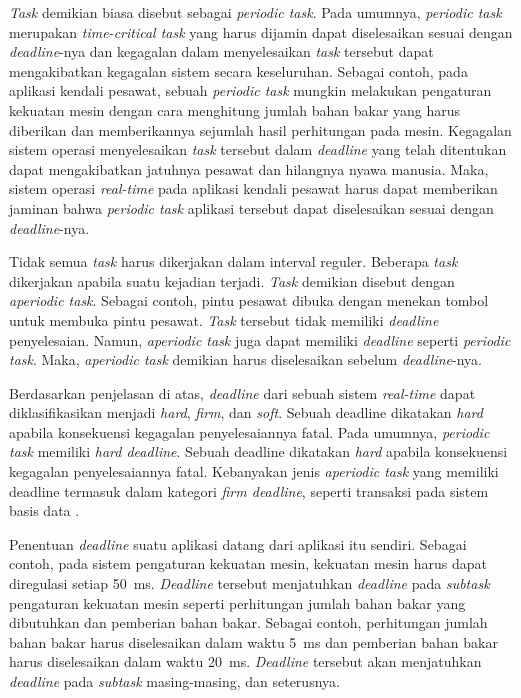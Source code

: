 \textit{Task} demikian biasa disebut sebagai \textit{periodic task}.
Pada umumnya, \textit{periodic task} merupakan \textit{time-critical task} yang harus dijamin dapat diselesaikan sesuai dengan \textit{deadline}-nya dan kegagalan dalam menyelesaikan \textit{task} tersebut dapat mengakibatkan kegagalan sistem secara keseluruhan.
Sebagai contoh, pada aplikasi kendali pesawat, sebuah \textit{periodic task} mungkin melakukan pengaturan kekuatan mesin dengan cara menghitung jumlah bahan bakar yang harus diberikan dan memberikannya sejumlah hasil perhitungan pada mesin.
Kegagalan sistem operasi menyelesaikan \textit{task} tersebut dalam \textit{deadline} yang telah ditentukan dapat mengakibatkan jatuhnya pesawat dan hilangnya nyawa manusia.
Maka, sistem operasi \textit{real-time} pada aplikasi kendali pesawat harus dapat memberikan jaminan bahwa \textit{periodic task} aplikasi tersebut dapat diselesaikan sesuai dengan \textit{deadline}-nya.

Tidak semua \textit{task} harus dikerjakan dalam interval reguler. Beberapa \textit{task} dikerjakan apabila suatu kejadian terjadi.
\textit{Task} demikian disebut dengan \textit{aperiodic task}.
Sebagai contoh, pintu pesawat dibuka dengan menekan tombol untuk membuka pintu pesawat.
\textit{Task} tersebut tidak memiliki \textit{deadline} penyelesaian.
Namun, \textit{aperiodic task} juga dapat memiliki \textit{deadline} seperti \textit{periodic task}.
Maka, \textit{aperiodic task} demikian harus diselesaikan sebelum \textit{deadline}-nya.

Berdasarkan penjelasan di atas, \textit{deadline} dari sebuah sistem \textit{real-time} dapat diklasifikasikan menjadi \textit{hard}, \textit{firm}, dan \textit{soft}.
Sebuah deadline dikatakan \textit{hard} apabila konsekuensi kegagalan penyelesaiannya fatal.
Pada umumnya, \textit{periodic task} memiliki \textit{hard deadline}.
Sebuah deadline dikatakan \textit{hard} apabila konsekuensi kegagalan penyelesaiannya fatal.
Kebanyakan jenis \textit{aperiodic task} yang memiliki deadline termasuk dalam kategori \textit{firm deadline}, seperti transaksi pada sistem basis data \citep[pp.~203-241]{Haritsa1992}.

Penentuan \textit{deadline} suatu aplikasi datang dari aplikasi itu sendiri.
Sebagai contoh, pada sistem pengaturan kekuatan mesin, kekuatan mesin harus dapat diregulasi setiap \SI{50}{\milli\second}.
\textit{Deadline} tersebut menjatuhkan \textit{deadline} pada \textit{subtask} pengaturan kekuatan mesin seperti perhitungan jumlah bahan bakar yang dibutuhkan dan pemberian bahan bakar.
Sebagai contoh, perhitungan jumlah bahan bakar harus diselesaikan dalam waktu \SI{5}{\milli\second} dan pemberian bahan bakar harus diselesaikan dalam waktu \SI{20}{\milli\second}.
\textit{Deadline} tersebut akan menjatuhkan \textit{deadline} pada \textit{subtask} masing-masing, dan seterusnya.

